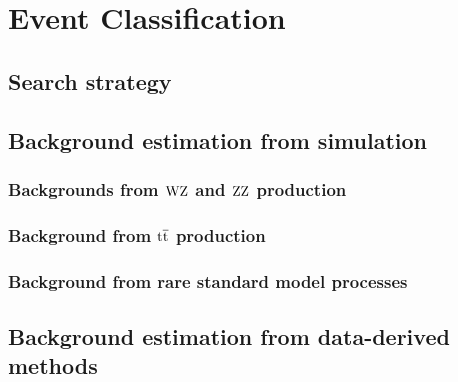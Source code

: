 \chapter{Event Classification}
\label{chap:EventClassification}
 

\section{Search strategy}
\label{sec:SearchStrategy}


\section{Background estimation from simulation}
\label{sec:BackgroundEstimationSimulation}

\subsection{Backgrounds from \texorpdfstring{$\mathrm{W} \mathrm{Z}$}{WZ} and \texorpdfstring{$\mathrm{Z} \mathrm{Z}$}{ZZ} production}
\label{sec:WZandZZProuction}


\subsection{Background from \texorpdfstring{$\mathrm{t}\overline{\mathrm{t}}$}{TTbar} production}
\label{sub:TTbarProduction}



\subsection{Background from rare standard model processes}
\label{sec:RareSMProuction}


\section{Background estimation from data-derived methods}
\label{sec:BackgroundEstimationDataDerived}


